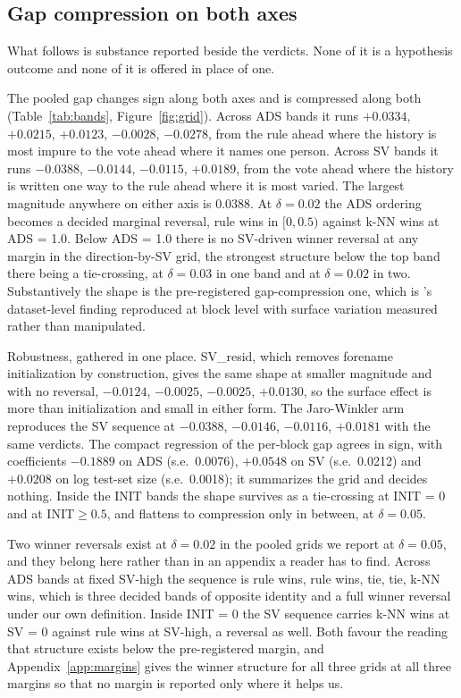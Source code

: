 \documentclass[11pt]{article}
\begin{document}
\subsection{Gap compression on both axes}
\label{sec:compression}

What follows is substance reported beside the verdicts. None of it is a
hypothesis outcome and none of it is offered in place of one.

The pooled gap changes sign along both axes and is compressed along both
(Table~\ref{tab:bands}, Figure~\ref{fig:grid}). Across ADS bands it runs
$+0.0334$, $+0.0215$, $+0.0123$, $-0.0028$, $-0.0278$, from the rule ahead
where the history is most impure to the vote ahead where it names one person.
Across SV bands it runs $-0.0388$, $-0.0144$, $-0.0115$, $+0.0189$, from the
vote ahead where the history is written one way to the rule ahead where it is
most varied. The largest magnitude anywhere on either axis is 0.0388. At
$\delta = 0.02$ the ADS ordering becomes a decided marginal reversal, rule
wins in $[0, 0.5)$ against k-NN wins at ADS = 1.0. Below ADS = 1.0 there is no
SV-driven winner reversal at any margin in the direction-by-SV grid, the
strongest structure below the top band there being a tie-crossing, at
$\delta = 0.03$ in one band and at $\delta = 0.02$ in two. Substantively the shape is the pre-registered
gap-compression one, which is \citeauthor{kimkim2020}'s dataset-level finding
reproduced at block level with surface variation measured rather than
manipulated.

Robustness, gathered in one place. SV\_resid, which removes forename
initialization by construction, gives the same shape at smaller magnitude and
with no reversal, $-0.0124$, $-0.0025$, $-0.0025$, $+0.0130$, so the surface
effect is more than initialization and small in either form. The Jaro-Winkler
arm reproduces the SV sequence at $-0.0388$, $-0.0146$, $-0.0116$, $+0.0181$
with the same verdicts. The compact regression of the per-block gap agrees in
sign, with coefficients $-0.1889$ on ADS (s.e.\ 0.0076), $+0.0548$ on SV
(s.e.\ 0.0212) and $+0.0208$ on log test-set size (s.e.\ 0.0018); it
summarizes the grid and decides nothing. Inside the INIT bands the shape
survives as a tie-crossing at INIT = 0 and at $\mathrm{INIT} \geq 0.5$, and
flattens to compression only in between, at $\delta = 0.05$.

Two winner reversals exist at $\delta = 0.02$ in the pooled grids we report
at $\delta = 0.05$, and they belong here rather than in an appendix a reader has
to find. Across ADS bands at fixed SV-high the sequence is rule wins, rule
wins, tie, tie, k-NN wins, which is three decided bands of opposite identity
and a full winner reversal under our own definition. Inside INIT = 0 the SV
sequence carries k-NN wins at SV = 0 against rule wins at SV-high, a reversal
as well. Both favour the reading that structure exists below the
pre-registered margin, and Appendix~\ref{app:margins} gives the winner
structure for all three grids at all three margins so that no margin is
reported only where it helps us.
\end{document}
